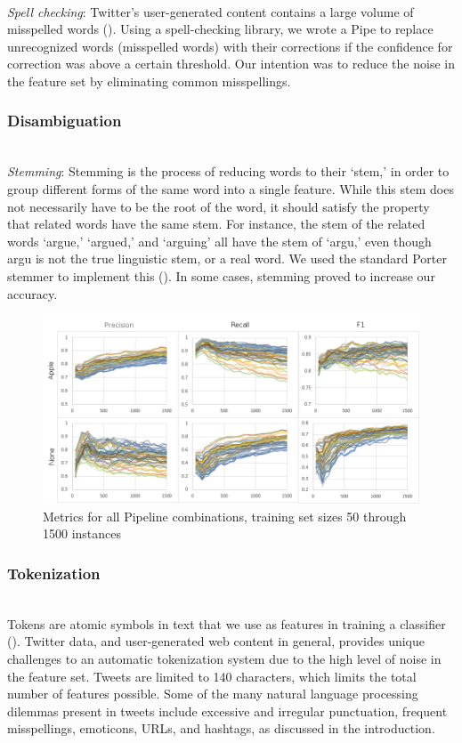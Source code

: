 \documentclass[letterpaper]{article}
\begin{document}
~\\
\textit{Spell checking}: Twitter's user-generated content contains a large volume of misspelled words (\citeauthor{Laboreiro:2010:TMM:1871840.1871853}). Using a spell-checking library, we wrote a Pipe to replace unrecognized words (misspelled words) with their corrections if the confidence for correction was above a certain threshold. Our intention was to reduce the noise in the feature set by eliminating common misspellings.
~\\
\subsubsection{Disambiguation}
~\\
\textit{Stemming}: Stemming is the process of reducing words to their `stem,' in order to group different forms of the same word into a single feature. While this stem does not necessarily have to be the root of the word, it should satisfy the property that related words have the same stem. For instance, the stem of the related words `argue,' `argued,' and `arguing' all have the stem of `argu,' even though argu is not the true linguistic stem, or a real word. We used the standard Porter stemmer to implement this (\citeauthor{porter_1980}).
In some cases, stemming proved to increase our accuracy.
\\

\begin{figure}[t!]
\centering
\includegraphics[width=\textwidth]{img/all-with-headings}
\caption{Metrics for all Pipeline combinations, training set sizes 50 through 1500 instances}
\label{fig:chart_all}
\end{figure}

\subsubsection{Tokenization}
~\\
Tokens are atomic symbols in text that we use as features in training a classifier (\citeauthor{Laboreiro:2010:TMM:1871840.1871853}). Twitter data, and user-generated web content in general, provides unique challenges to an automatic tokenization system due to the high level of noise in the feature set. Tweets are limited to 140 characters, which limits the total number of features possible. Some of the many natural language processing dilemmas present in tweets include excessive and irregular punctuation, frequent misspellings, emoticons, URLs, and hashtags, as discussed in the introduction.\\
\end{document}
